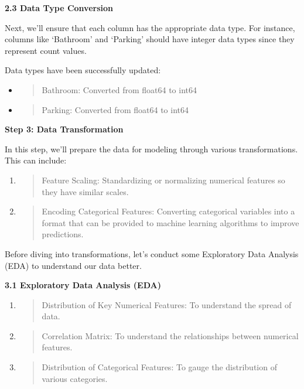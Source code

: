 \documentclass[]{article}
\newcommand{\textcenter}[1]{\begin{center} \vspace{10px}\textbf{\large #1} \end{center}}
\begin{document}
\textbf{2.3 Data Type Conversion}

Next, we'll ensure that each column has the appropriate data type. For
instance, columns like `Bathroom' and `Parking' should have integer data
types since they represent count values.

Data types have been successfully updated:

\begin{itemize}
\item
  \begin{quote}
  Bathroom: Converted from float64 to int64
  \end{quote}
\item
  \begin{quote}
  Parking: Converted from float64 to int64
  \end{quote}
\end{itemize}

\textcenter{Step 3: Data Transformation}

In this step, we'll prepare the data for modeling through various
transformations. This can include:

\begin{enumerate}
\def\labelenumi{\arabic{enumi}.}
\item
  \begin{quote}
  Feature Scaling: Standardizing or normalizing numerical features so
  they have similar scales.
  \end{quote}
\item
  \begin{quote}
  Encoding Categorical Features: Converting categorical variables into a
  format that can be provided to machine learning algorithms to improve
  predictions.
  \end{quote}
\end{enumerate}

Before diving into transformations, let's conduct some Exploratory Data
Analysis (EDA) to understand our data better.

\textbf{3.1 Exploratory Data Analysis (EDA)}

\begin{enumerate}
\def\labelenumi{\arabic{enumi}.}
\item
  \begin{quote}
  Distribution of Key Numerical Features: To understand the spread of
  data.
  \end{quote}
\item
  \begin{quote}
  Correlation Matrix: To understand the relationships between numerical
  features.
  \end{quote}
\item
  \begin{quote}
  Distribution of Categorical Features: To gauge the distribution of
  various categories.
  \end{quote}
\end{enumerate}
\end{document}
